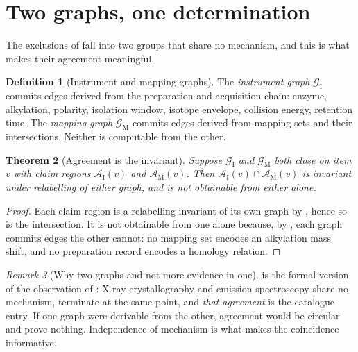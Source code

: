 \documentclass[11pt,a4paper]{article}
\newtheorem{theorem}{Theorem}[section]
\theoremstyle{definition}
\newtheorem{definition}[theorem]{Definition}
\theoremstyle{remark}
\newtheorem{remark}[theorem]{Remark}
\newcommand{\Gph}{\mathcal{G}}              %
\newcommand{\amb}{\mathcal{A}}               %
\begin{document}
\section{Two graphs, one determination}
\label{sec:twographs}

The exclusions of  fall into two groups that share no
mechanism, and this is what makes their agreement meaningful.

\begin{definition}[Instrument and mapping graphs]
\label{def:twographs}
The \emph{instrument graph} $\Gph_{\mathrm{I}}$ commits edges derived
from the preparation and acquisition chain: enzyme, alkylation, polarity,
isolation window, isotope envelope, collision energy, retention time.
The \emph{mapping graph} $\Gph_{\mathrm{M}}$ commits edges derived from
mapping sets and their intersections. Neither is computable from the
other.
\end{definition}

\begin{theorem}[Agreement is the invariant]
\label{thm:agreement}
Suppose $\Gph_{\mathrm{I}}$ and $\Gph_{\mathrm{M}}$ both close on item
$v$ with claim regions $\amb_{\mathrm{I}}(v)$ and $\amb_{\mathrm{M}}(v)$.
Then $\amb_{\mathrm{I}}(v)\cap\amb_{\mathrm{M}}(v)$ is invariant under
relabelling of either graph, and is not obtainable from either alone.
\end{theorem}

\begin{proof}
Each claim region is a relabelling invariant of its own graph by
, hence so is the intersection. It is not obtainable
from one alone because, by , each graph commits edges
the other cannot: no mapping set encodes an alkylation mass shift, and no
preparation record encodes a homology relation.
\end{proof}

\begin{remark}[Why two graphs and not more evidence in one]
\label{rem:why-two}
 is the formal version of the observation of
: X-ray crystallography and emission spectroscopy share
no mechanism, terminate at the same point, and \emph{that agreement} is
the catalogue entry. If one graph were derivable from the other,
agreement would be circular and prove nothing. Independence of mechanism
is what makes the coincidence informative.
\end{remark}
\end{document}
